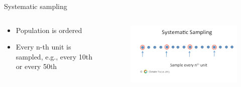 \documentclass[10pt, compress]{beamer}
\begin{document}
\begin{frame}[t]{Systematic sampling}
    \begin{columns}
        \begin{block}{}
            \begin{itemize}
                \item Population is ordered
                \item Every n-th unit is sampled, e.g., every 10th or every 50th
            \end{itemize}
        \end{block}
        \begin{block}{}
            \begin{figure}
                \begin{center}
                    \includegraphics[scale=0.25]{img/Slide4.png}
                \end{center}
            \end{figure}
        \end{block}
    \end{columns}

\end{frame}
\end{document}
